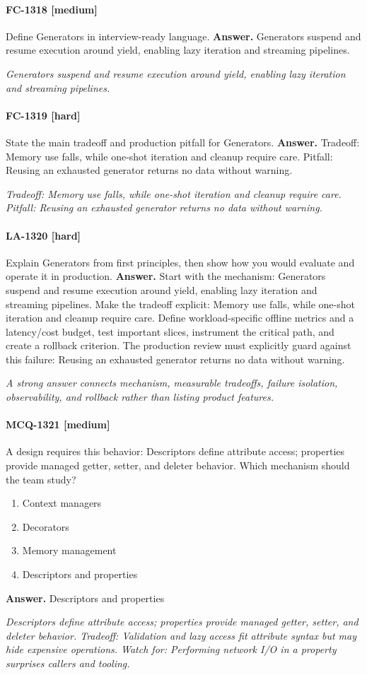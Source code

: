 \paragraph{FC-1318 [medium]} Define Generators in interview-ready language.
\noindent\textbf{Answer.} Generators suspend and resume execution around yield, enabling lazy iteration and streaming pipelines.
\par\textit{Generators suspend and resume execution around yield, enabling lazy iteration and streaming pipelines.}
\paragraph{FC-1319 [hard]} State the main tradeoff and production pitfall for Generators.
\noindent\textbf{Answer.} Tradeoff: Memory use falls, while one-shot iteration and cleanup require care. Pitfall: Reusing an exhausted generator returns no data without warning.
\par\textit{Tradeoff: Memory use falls, while one-shot iteration and cleanup require care. Pitfall: Reusing an exhausted generator returns no data without warning.}
\paragraph{LA-1320 [hard]} Explain Generators from first principles, then show how you would evaluate and operate it in production.
\noindent\textbf{Answer.} Start with the mechanism: Generators suspend and resume execution around yield, enabling lazy iteration and streaming pipelines. Make the tradeoff explicit: Memory use falls, while one-shot iteration and cleanup require care. Define workload-specific offline metrics and a latency/cost budget, test important slices, instrument the critical path, and create a rollback criterion. The production review must explicitly guard against this failure: Reusing an exhausted generator returns no data without warning.
\par\textit{A strong answer connects mechanism, measurable tradeoffs, failure isolation, observability, and rollback rather than listing product features.}
\paragraph{MCQ-1321 [medium]} A design requires this behavior: Descriptors define attribute access; properties provide managed getter, setter, and deleter behavior. Which mechanism should the team study?
\begin{enumerate}[label=\Alph*.]
\item Context managers
\item Decorators
\item Memory management
\item Descriptors and properties
\end{enumerate}
\noindent\textbf{Answer.} Descriptors and properties
\par\textit{Descriptors define attribute access; properties provide managed getter, setter, and deleter behavior. Tradeoff: Validation and lazy access fit attribute syntax but may hide expensive operations. Watch for: Performing network I/O in a property surprises callers and tooling.}
